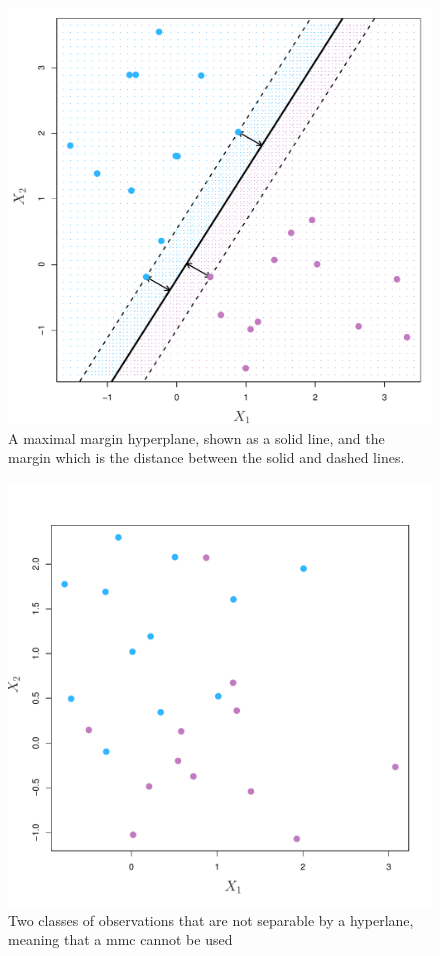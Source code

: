 \documentclass[11pt]{article}
\begin{document}
\begin{figure}[ht]
  \centering
  \includegraphics[width=12cm]{graphics/9_3.pdf}
  \caption{A maximal margin hyperplane, shown as a solid line, and the margin which is the distance between the solid and dashed lines.}
\end{figure}

\begin{figure}[ht]
  \centering
  \includegraphics[width=12cm]{graphics/9_4.pdf}
  \caption{Two classes of observations that are not separable by a hyperlane, meaning that a \gls{mmc} cannot be used}
\end{figure}
\end{document}
